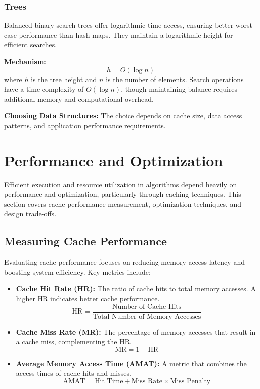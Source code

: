 \documentclass[12pt]{book} %
\begin{document}
\subsubsection{Trees}

Balanced binary search trees offer logarithmic-time access, ensuring better worst-case performance than hash maps. They maintain a logarithmic height for efficient searches.

\textbf{Mechanism:} 
\[ h = O(\log n) \]
where \(h\) is the tree height and \(n\) is the number of elements. Search operations have a time complexity of \(O(\log n)\), though maintaining balance requires additional memory and computational overhead.

\textbf{Choosing Data Structures:} The choice depends on cache size, data access patterns, and application performance requirements.

\section{Performance and Optimization}

Efficient execution and resource utilization in algorithms depend heavily on performance and optimization, particularly through caching techniques. This section covers cache performance measurement, optimization techniques, and design trade-offs.

\subsection{Measuring Cache Performance}

Evaluating cache performance focuses on reducing memory access latency and boosting system efficiency. Key metrics include:

\begin{itemize}
    \item \textbf{Cache Hit Rate (HR):} The ratio of cache hits to total memory accesses. A higher HR indicates better cache performance.
    \begin{equation*}
        \text{HR} = \frac{\text{Number of Cache Hits}}{\text{Total Number of Memory Accesses}}
    \end{equation*}
    
    \item \textbf{Cache Miss Rate (MR):} The percentage of memory accesses that result in a cache miss, complementing the HR.
    \begin{equation*}
        \text{MR} = 1 - \text{HR}
    \end{equation*}
    
    \item \textbf{Average Memory Access Time (AMAT):} A metric that combines the access times of cache hits and misses.
    \begin{equation*}
        \text{AMAT} = \text{Hit Time} + \text{Miss Rate} \times \text{Miss Penalty}
    \end{equation*}
\end{itemize}
\end{document}
